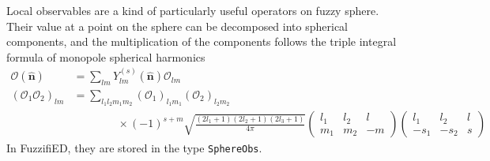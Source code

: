 \documentclass{timesjhep}
\begin{document}
Local observables are a kind of particularly useful operators on fuzzy sphere. Their value at a point on the sphere can be decomposed into spherical components, and the multiplication of the components follows the triple integral formula of monopole spherical harmonics
\begin{align}
    \mathcal{O}(\hat{\mathbf{n}})&=\sum_{lm}Y^{(s)}_{lm}(\hat{\mathbf{n}})\mathcal{O}_{lm}\nonumber\\
    (\mathcal{O}_1\mathcal{O}_2)_{lm}&=\sum_{l_1l_2m_1m_2}(\mathcal{O}_1)_{l_1m_1}(\mathcal{O}_2)_{l_2m_2}\nonumber\\
    &\qquad\qquad\times(-1)^{s+m}\sqrt{\frac{(2l_1+1)(2l_2+1)(2l_3+1)}{4\pi}}\begin{pmatrix}l_1&l_2&l\\m_1&m_2&-m\end{pmatrix}\begin{pmatrix}l_1&l_2&l\\-s_1&-s_2&s\end{pmatrix}
\end{align}
In FuzzifiED, they are stored in the type \lstinline|SphereObs|.
\end{document}
